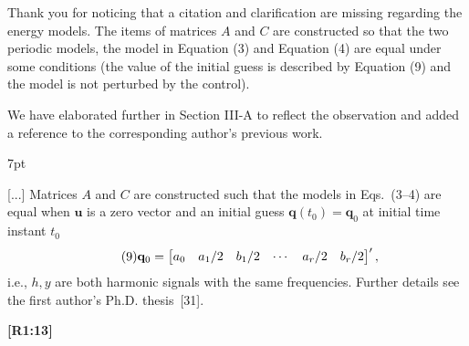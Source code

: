 \documentclass[10pt]{letter}
\newenvironment{formal}{%
  \def\FrameCommand{%
    \hspace{1pt}%
    {\color{red}\vrule width 2pt}%
    {\color{formalshade}\vrule width 4pt}%
    \colorbox{formalshade}%
  }%
  \MakeFramed{\advance\hsize-\width\FrameRestore}%
  \noindent\hspace{-4.55pt}%
  \begin{adjustwidth}{}{7pt}%
  \vspace{2pt}\vspace{2pt}%
}
{%
  \vspace{2pt}\end{adjustwidth}\endMakeFramed%
}
\begin{document}
{\color{blue} 

{\hspace*{-4.5em}{[R1:12]}\vspace*{-1.9em}}

Thank you for noticing that a citation and clarification are missing regarding the energy models. The items of matrices $A$ and $C$ are constructed so that the two periodic models, the model in Equation ({\color{red}3}) and Equation ({\color{red}4}) are equal under some conditions (the value of the initial guess is described by Equation ({\color{red}9}) and the model is not perturbed by the control).

We have elaborated further in Section III-A to reflect the observation and added a reference to the corresponding author's previous work.

\begin{formal}
  {\color{black}
  [...] {\color{blue}Matrices $A$ and $C$ are constructed such that t}he %
  models in Eqs.~({\color{red}3}--{\color{red}4}) {\color{black}are equal when $\mathbf{u}$ is a {\color{black}zero vector %
  and an initial guess $\mathbf{q}(t_0)=\mathbf{q}_0$ at initial time instant $t_0$}}
    {\color{blue}\begin{equation}\tag{9}
    {\color{black}\mathbf{q}_0=\begin{bmatrix}a_0 & a_1/2 & b_1/2 & \cdots & a_r/2 & b_r/2\end{bmatrix}',}
    \end{equation}}
  \color{black}i.e., $h,y$ are both harmonic signals with the same frequencies. {\color{blue}Further details see the first author's Ph.D. thesis~[{\color{green}31}]}.
  }
  \vspace*{1ex}
\end{formal}
}

{\hspace*{-4.5em}\textbf{[R1:13]}\vspace*{-1.9em}}
\end{document}
